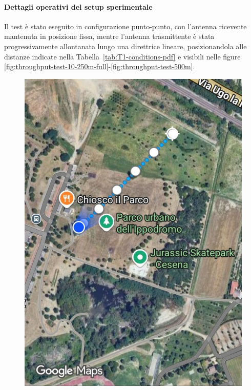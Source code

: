 \documentclass[12pt,a4paper,twoside]{book}
\begin{document}
\paragraph{Dettagli operativi del setup sperimentale}

Il test è stato eseguito in configurazione punto-punto, con l'antenna ricevente
mantenuta in posizione fissa, mentre l'antenna trasmittente
è stata progressivamente allontanata lungo una direttrice lineare, posizionandola
alle distanze indicate nella Tabella~\ref{tab:T1-conditions-pdf} e visibili nelle figure
\ref{fig:throughput-test-10-250m-full}-\ref{fig:throughput-test-500m}.

\begin{figure}[H]
    \centering
    \begin{minipage}{0.32\textwidth}
        \centering
        \includegraphics[width=\textwidth]{img/tests/T1/sat/10-250-full.jpeg}

\end{minipage}
\end{figure}
\end{document}
